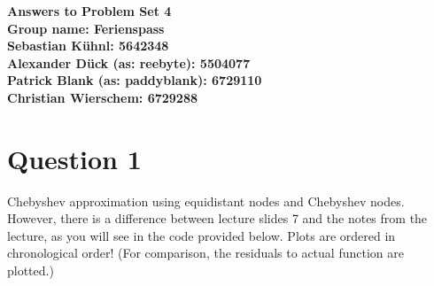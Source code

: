 \documentclass{article}
\begin{document}
	\begin{center}
		\LARGE \bfseries{Answers to Problem Set 4}\\
		Group name: Ferienspass\vspace{.5cm}\\
		\normalsize \normalfont
		Sebastian K\"uhnl: 5642348\\
		Alexander D\"uck (as: reebyte): 5504077\\
		Patrick Blank (as: paddyblank): 6729110\\
		Christian Wierschem: 6729288
	\end{center}
	\normalsize	
	\section{Question 1}
	Chebyshev approximation using equidistant nodes and Chebyshev nodes. However, there is a difference between lecture slides 7 and the notes from the lecture, as you will see in the code provided below.
	Plots are ordered in chronological order! (For comparison, the residuals to actual function are plotted.)\\
\end{document}
